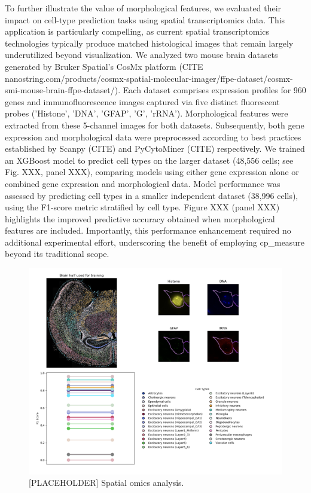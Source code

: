\documentclass{article}
\begin{document}
To further illustrate the value of morphological features, we evaluated their impact on cell-type prediction tasks using spatial transcriptomics data. This application is particularly compelling, as current spatial transcriptomics technologies typically produce matched histological images that remain largely underutilized beyond visualization. We analyzed two mouse brain datasets generated by Bruker Spatial's CosMx platform (CITE nanostring.com/products/cosmx-spatial-molecular-imager/ffpe-dataset/cosmx-smi-mouse-brain-ffpe-dataset/). Each dataset comprises expression profiles for 960 genes and immunofluorescence images captured via five distinct fluorescent probes ('Histone', 'DNA', 'GFAP', 'G', 'rRNA'). Morphological features were extracted from these 5-channel images for both datasets. Subsequently, both gene expression and morphological data were preprocessed according to best practices established by Scanpy (CITE) and PyCytoMiner (CITE) respectively. We trained an XGBoost model to predict cell types on the larger dataset (48,556 cells; see Fig. XXX, panel XXX), comparing models using either gene expression alone or combined gene expression and morphological data. Model performance was assessed by predicting cell types in a smaller independent dataset (38,996 cells), using the F1-score metric stratified by cell type. Figure XXX (panel XXX) highlights the improved predictive accuracy obtained when morphological features are included. Importantly, this performance enhancement required no additional experimental effort, underscoring the benefit of employing cp\_measure beyond its traditional scope.

\begin{figure}[htbp]
\centering
\includegraphics[width=.9\linewidth]{./figs/spatial.png}
\caption{\label{fig:spatial_omics}{[}PLACEHOLDER] Spatial omics analysis.}
\end{figure}
\end{document}
